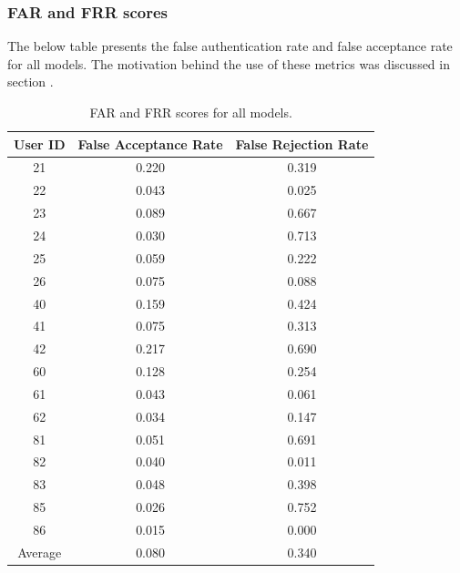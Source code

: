 
\subsubsection{FAR and FRR scores}
The below table presents the false authentication rate and false acceptance rate for all models. The motivation behind the use of these metrics was discussed in section .

\begin{center}
\begin{table}[H]
\begin{center}
	\begin{tabular}{ |c|c|c| } 
		\hline
		User ID & False Acceptance Rate & False Rejection Rate \\
		\hline
		21 & 0.220 & 0.319 \\
		\hline
		22 & 0.043 & 0.025 \\
		\hline
		23 & 0.089 & 0.667 \\
		\hline
		24 & 0.030 & 0.713 \\
		\hline
		25 & 0.059 & 0.222 \\
		\hline
		26 & 0.075 & 0.088 \\
		\hline
		40 & 0.159 & 0.424 \\
		\hline
		41 & 0.075 & 0.313 \\
		\hline
		42 & 0.217 & 0.690 \\
		\hline
		60 & 0.128 & 0.254 \\
		\hline
		61 & 0.043 & 0.061 \\
		\hline
		62 & 0.034 & 0.147 \\
		\hline
		81 & 0.051 & 0.691 \\
		\hline
		82 & 0.040 & 0.011 \\
		\hline
		83 & 0.048 & 0.398 \\
		\hline
		85 & 0.026 & 0.752 \\
		\hline
		86 & 0.015 & 0.000 \\
		\hline
		\hline
		Average & 0.080 & 0.340 \\
		\hline
	\end{tabular}
\end{center}
\caption{FAR and FRR scores for all models.}
\label{table:FAR_FRR_base}
\end{table}
\end{center}

